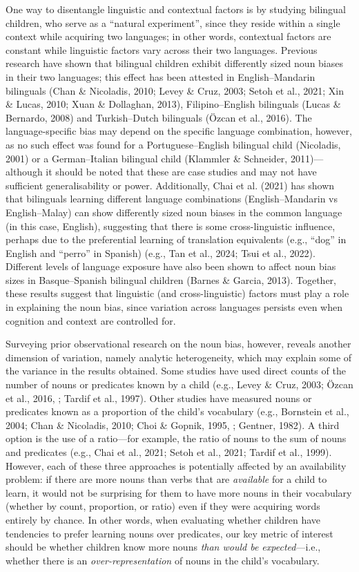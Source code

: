 \documentclass[10pt, letterpaper]{article}
\begin{document}
One way to disentangle linguistic and contextual factors is by studying
bilingual children, who serve as a ``natural experiment'', since they
reside within a single context while acquiring two languages; in other
words, contextual factors are constant while linguistic factors vary
across their two languages. Previous research have shown that bilingual
children exhibit differently sized noun biases in their two languages;
this effect has been attested in English--Mandarin bilinguals (Chan \&
Nicoladis, 2010; Levey \& Cruz, 2003; Setoh et al., 2021; Xin \& Lucas,
2010; Xuan \& Dollaghan, 2013), Filipino--English bilinguals (Lucas \&
Bernardo, 2008) and Turkish--Dutch bilinguals (Özcan et al., 2016). The
language-specific bias may depend on the specific language combination,
however, as no such effect was found for a Portuguese--English bilingual
child (Nicoladis, 2001) or a German--Italian bilingual child (Klammler
\& Schneider, 2011)---although it should be noted that these are case
studies and may not have sufficient generalisability or power.
Additionally, Chai et al. (2021) has shown that bilinguals learning
different language combinations (English--Mandarin vs English--Malay)
can show differently sized noun biases in the common language (in this
case, English), suggesting that there is some cross-linguistic
influence, perhaps due to the preferential learning of translation
equivalents (e.g., ``dog'' in English and ``perro'' in Spanish) (e.g.,
Tan et al., 2024; Tsui et al., 2022). Different levels of language
exposure have also been shown to affect noun bias sizes in
Basque--Spanish bilingual children (Barnes \& Garcia, 2013). Together,
these results suggest that linguistic (and cross-linguistic) factors
must play a role in explaining the noun bias, since variation across
languages persists even when cognition and context are controlled for.

Surveying prior observational research on the noun bias, however,
reveals another dimension of variation, namely analytic heterogeneity,
which may explain some of the variance in the results obtained. Some
studies have used direct counts of the number of nouns or predicates
known by a child (e.g., Levey \& Cruz, 2003; Özcan et al., 2016, ;
Tardif et al., 1997). Other studies have measured nouns or predicates
known as a proportion of the child's vocabulary (e.g., Bornstein et al.,
2004; Chan \& Nicoladis, 2010; Choi \& Gopnik, 1995, ; Gentner, 1982). A
third option is the use of a ratio---for example, the ratio of nouns to
the sum of nouns and predicates (e.g., Chai et al., 2021; Setoh et al.,
2021; Tardif et al., 1999). However, each of these three approaches is
potentially affected by an availability problem: if there are more nouns
than verbs that are \emph{available} for a child to learn, it would not
be surprising for them to have more nouns in their vocabulary (whether
by count, proportion, or ratio) even if they were acquiring words
entirely by chance. In other words, when evaluating whether children
have tendencies to prefer learning nouns over predicates, our key metric
of interest should be whether children know more nouns \emph{than would
be expected}---i.e., whether there is an \emph{over-representation} of
nouns in the child's vocabulary.
\end{document}
